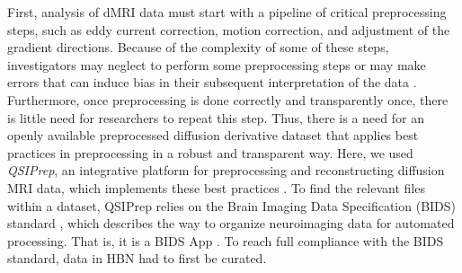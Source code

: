 \documentclass[fleqn,10pt]{wlscirep}
\begin{document}
First, analysis of dMRI data must start with a pipeline of critical
preprocessing steps, such as eddy current correction, motion correction, and
adjustment of the gradient directions. Because of the complexity of some of
these steps, investigators may neglect to perform some preprocessing steps or
may make errors that can induce bias in their subsequent interpretation of the
data \cite{jones2010-ps}. Furthermore, once preprocessing is done correctly and
transparently once, there is little need for researchers to repeat this step.
Thus, there is a need for an openly available preprocessed diffusion derivative
dataset that applies best practices in preprocessing in a robust and transparent
way. Here, we used \emph{QSIPrep}, an integrative platform for preprocessing and
reconstructing diffusion MRI data, which implements these best practices
\cite{cieslak2021-iq}. To find the relevant files within a dataset, QSIPrep
relies on the Brain Imaging Data Specification (BIDS) standard
\cite{gorgolewski2016-lh}, which describes the way to organize neuroimaging data
for automated processing. That is, it is a BIDS App \cite{Gorgolewski2017-mb}.
To reach full compliance with the BIDS standard, data in HBN had to first be
curated.

\end{document}
